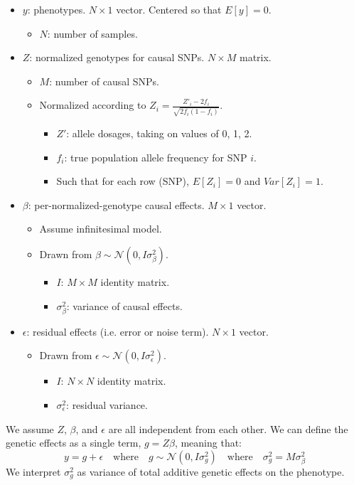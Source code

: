 \documentclass[12pt]{article}
\begin{document}
\begin{itemize}
    \item $y$: phenotypes.
    $N \times 1$ vector.
    Centered so that $E[y]=0$.
    \begin{itemize}
        \item $N$: number of samples.
    \end{itemize}
    \item $Z$: normalized genotypes for causal SNPs.
    $N \times M$ matrix.
    \begin{itemize}
        \item $M$: number of causal SNPs.
        \item Normalized according to
        $Z_i =  \frac{Z'_i - 2 f_i}{\sqrt{2 f_i (1 - f_i)}}$.
        \begin{itemize}
            \item $Z'$: allele dosages, taking on values of 0, 1, 2.
            \item $f_i$: true population allele frequency for SNP $i$.
            \item Such that for each row (SNP), $E[Z_i] = 0$ and $Var[Z_i] = 1$.
        \end{itemize}
    \end{itemize}
    \item $\beta$: per-normalized-genotype causal effects.
    $M \times 1$ vector.
    \begin{itemize}
        \item Assume infinitesimal model.
        \item Drawn from $\beta \sim \mathcal{N}(0, I \sigma_{\beta}^2)$.
        \begin{itemize}
            \item $I$: $M \times M$ identity matrix.
            \item $\sigma_{\beta}^2$: variance of causal effects.
        \end{itemize}
    \end{itemize}
    \item $\epsilon$: residual effects (i.e. error or noise term). $N \times 1$ vector.
    \begin{itemize}
        \item Drawn from $\epsilon \sim \mathcal{N}(0, I \sigma_{\epsilon}^2)$.
        \begin{itemize}
            \item $I$: $N \times N$ identity matrix.
            \item $\sigma_{\epsilon}^2$: residual variance.
        \end{itemize}
    \end{itemize}
\end{itemize}
We assume $Z$, $\beta$, and $\epsilon$ are all independent from each other. We can define the genetic effects as a single term, $g = Z \beta$, meaning that:
\begin{equation*}
y = g + \epsilon
\quad\mathrm{where}\quad
g \sim \mathcal{N}(0, I \sigma_{g}^2)
\quad\mathrm{where}\quad
\sigma_{g}^2 = M \sigma_{\beta}^2
\end{equation*}
We interpret $\sigma_{g}^2$ as variance of total additive genetic effects on the phenotype.
\end{document}
